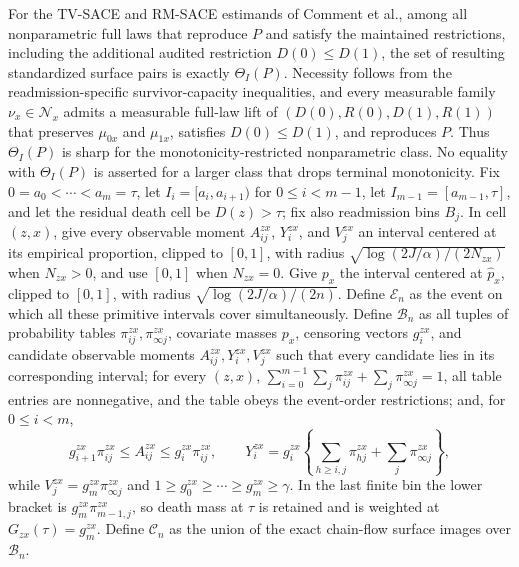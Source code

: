 For the TV-SACE and RM-SACE estimands of Comment et al., among all nonparametric full laws that reproduce \(P\) and satisfy the maintained restrictions, including the additional audited restriction \(D(0)\leq D(1)\), the set of resulting standardized surface pairs is exactly \(\Theta_I(P)\).  Necessity follows from the readmission-specific survivor-capacity inequalities, and every measurable family \(\nu_x\in\mathcal N_x\) admits a measurable full-law lift of \((D(0),R(0),D(1),R(1))\) that preserves \(\mu_{0x}\) and \(\mu_{1x}\), satisfies \(D(0)\leq D(1)\), and reproduces \(P\).  Thus \(\Theta_I(P)\) is sharp for the monotonicity-restricted nonparametric class.  No equality with \(\Theta_I(P)\) is asserted for a larger class that drops terminal monotonicity.
Fix \(0=a_0<\cdots<a_m=\tau\), let \(I_i=[a_i,a_{i+1})\) for \(0\leq i<m-1\), let \(I_{m-1}=[a_{m-1},\tau]\), and let the residual death cell be \(D(z)>\tau\); fix also readmission bins \(B_j\).  In cell \((z,x)\), give every observable moment \(A^{zx}_{ij}\), \(Y^{zx}_i\), and \(V^{zx}_j\) an interval centered at its empirical proportion, clipped to \([0,1]\), with radius \(\sqrt{\log(2J/\alpha)/(2N_{zx})}\) when \(N_{zx}>0\), and use \([0,1]\) when \(N_{zx}=0\).  Give \(p_x\) the interval centered at \(\widehat p_x\), clipped to \([0,1]\), with radius \(\sqrt{\log(2J/\alpha)/(2n)}\).  Define \(\mathscr E_n\) as the event on which all these primitive intervals cover simultaneously.  Define \(\mathcal B_n\) as all tuples of probability tables \(\pi^{zx}_{ij},\pi^{zx}_{\infty j}\), covariate masses \(p_x\), censoring vectors \(g^{zx}_i\), and candidate observable moments \(A^{zx}_{ij},Y^{zx}_i,V^{zx}_j\) such that every candidate lies in its corresponding interval; for every \((z,x)\), \(\sum_{i=0}^{m-1}\sum_j\pi^{zx}_{ij}+\sum_j\pi^{zx}_{\infty j}=1\), all table entries are nonnegative, and the table obeys the event-order restrictions; and, for \(0\leq i<m\),
\[
g^{zx}_{i+1}\pi^{zx}_{ij}\leq A^{zx}_{ij}\leq g^{zx}_i\pi^{zx}_{ij},
\qquad
Y^{zx}_i=g^{zx}_i\left\{\sum_{h\geq i,j}\pi^{zx}_{hj}+\sum_j\pi^{zx}_{\infty j}\right\},
\]
while \(V^{zx}_j=g^{zx}_m\pi^{zx}_{\infty j}\) and \(1\geq g^{zx}_0\geq\cdots\geq g^{zx}_m\geq\gamma\).  In the last finite bin the lower bracket is \(g^{zx}_m\pi^{zx}_{m-1,j}\), so death mass at \(\tau\) is retained and is weighted at \(G_{zx}(\tau)=g^{zx}_m\).  Define \(\mathcal C_n\) as the union of the exact chain-flow surface images over \(\mathcal B_n\).
